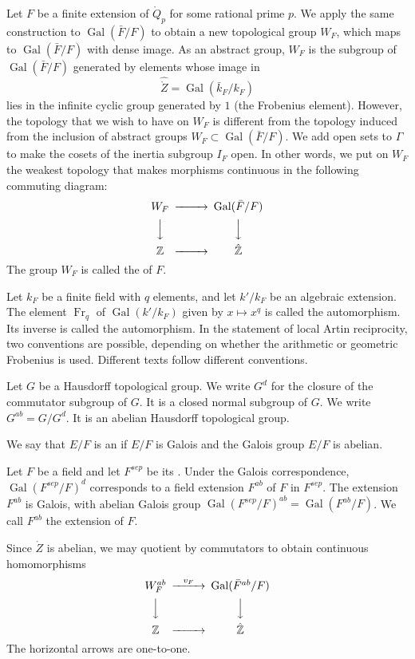 \documentclass{amsart}
\def\op#1{{\operatorname{#1}}}
\def\oG{\op{Gal}}
\begin{document}
Let $F$ be a finite extension of $\ring{Q}_p$ for some rational prime $p$.
We apply the same construction to $\oG(\bar F/F)$ to obtain a 
new topological group $W_F$, which maps to $\oG(\bar F/F)$ with dense
image.  As an abstract group, $W_F$ is the subgroup of $\oG(\bar F/F)$
generated by elements whose image in
\[
\hat{\ring{Z}} = \oG(\bar k_F/k_F)
\]
lies in the infinite cyclic group generated by $1$ (the Frobenius element).
However, the topology that we wish to have on $W_F$ is different from the
topology induced from the inclusion of abstract groups $W_F\subset \oG(\bar F/F)$.
We add open sets to $\Gamma$ to make the cosets of the inertia subgroup $I_F$
open.  In other words, we put on $W_F$ the weakest topology that makes 
morphisms continuous in the following commuting diagram:
\[
\begin{CD}
W_F @>>> \oG(\bar F/F)\\
@VVV @VVV\\
\ring{Z} @>>> \hat{\ring{Z}}\\
\end{CD}
\]
The group $W_F$ is called the  of $F$.


Let $k_F$ be a finite field with $q$ elements, and let $k'/k_F$ be an
algebraic extension.  The element $\op{Fr}_q$ of $\oG(k'/k_F)$
given by $x\mapsto x^q$ is called the 
automorphism.  Its inverse is called the 
automorphism.  In the statement of local Artin reciprocity, two
conventions are possible, depending on whether the arithmetic
or geometric Frobenius is used.  Different texts follow different conventions.

Let $G$ be a Hausdorff topological group.  We write $G^d$ for the closure of
the commutator subgroup of $G$.  It is a closed normal subgroup of $G$.
We write $G^{ab} = G/G^d$.  It is an abelian Hausdorff topological group.

We say that  $E/F$ is an  if $E/F$ is Galois and
the Galois group $E/F$ is abelian.

Let $F$ be a field and let $F^{sep}$ be its .
Under the Galois correspondence, $\oG(F^{sep}/F)^d$ corresponds to
a field extension $F^{ab}$ of $F$ in $F^{sep}$.  The extension $F^{ab}$ is
Galois, with abelian Galois group $\oG(F^{sep}/F)^{ab} = \oG(F^{ab}/F)$.
We call $F^{ab}$ the  extension of $F$.

Since $\ring{Z}$ is abelian, we may quotient by commutators to obtain
continuous homomorphisms
\[
\begin{CD}
W^{ab}_F @>v_F>> \oG(\bar F^{ab}/F)\\
@VVV @VVV\\
\ring{Z} @>>> \hat{\ring{Z}}\\
\end{CD}
\]
The horizontal arrows are one-to-one.
\end{document}
